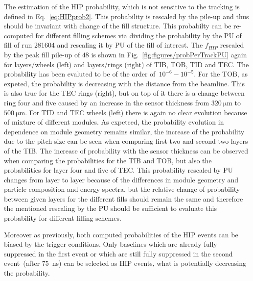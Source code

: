 The estimation of the HIP probability, which is not sensitive to the tracking is defined in Eq.~\ref{eq:HIPprob2}. This probability is rescaled by the pile-up and thus should be invariant with change of the fill structure. This probabilty can be re-computed for different filling schemes via dividing the probability by the PU of fill of run 281604 and rescaling it by PU of the fill of interest. The $f_{HIP}$ rescaled by the peak fill pile-up of $48$ is shown in Fig.~\ref{fig:figures/probPerTrackPU} again for layers/wheels (left) and layers/rings (right) of TIB, TOB, TID and TEC. The probability has been evaluted to be of the order of~$10^{-6}-10^{-5}$. For the TOB, as expeted, the probability is decreasing with the distance from the beamline. This is also true for the TEC rings (right),  but on top of it there is a change between ring four and five caused by an increase in the sensor thickness from $320~\mathrm{\mu m}$ to $500~\mathrm{\mu m}$. For TID and TEC wheels (left) there is again no clear evolution because of mixture of different modules. As expetced, the probability evolution in dependence on module geometry remains similar, the increase of the probability due to the pitch size can be seen when comparing first two and second two layers of the TIB. The increase of probability with the sensor thickness can be observed when comparing the probabilities for the TIB and TOB, but also the probabilities for layer four and five of TEC. This probability rescaled by PU changes from layer to layer because of the differences in module geometry and particle composition and energy spectra, but the relative change of probability between given layers for the different fills should remain the same and therefore the mentioned rescaling by the PU should be sufficient to evaluate this probability for different filling schemes.


Moreover as previously, both computed probabilities of the HIP events can be biased by the trigger conditions. Only baselines which are already fully suppressed in the first event or which are still fully suppressed in the second event~(after 75~ns) can be selected as HIP events, what is potentially decreasing the probability.


